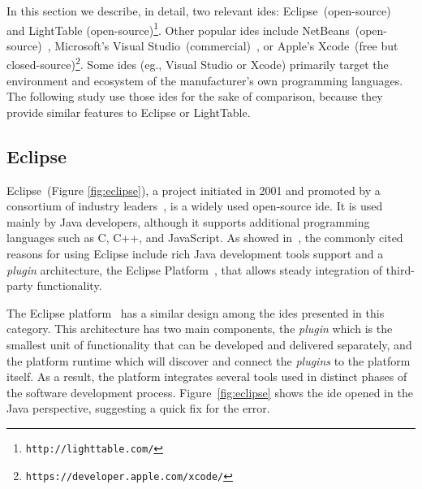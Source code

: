 In this section we describe, in detail, two relevant \glspl{ide}: Eclipse~(open-source)~\citep{carlson2005eclipse} and LightTable (open-source)\footnote{\label{fnote:lt}\texttt{http://lighttable.com/}}. Other popular \glspl{ide} include NetBeans~(open-source)~\citep{boudreau2002netbeans}, Microsoft's Visual Studio~(commercial)~\citep{guckenheimer2006software}, or Apple's Xcode~(free but closed-source)\footnote{\texttt{https://developer.apple.com/xcode/}}. Some \glspl{ide} (eg., Visual Studio or Xcode) primarily target the environment and ecosystem of the manufacturer's own programming languages.  The following study use those \glspl{ide} for the sake of comparison, because they provide similar features to Eclipse or LightTable.

\subsection{Eclipse} 
\label{subsec:eclipse}
Eclipse~(Figure \ref{fig:eclipse}), a project initiated in 2001 and promoted by a consortium of industry leaders~\citep{carlson2005eclipse}, is a widely used open-source \gls{ide}. It is used mainly by Java developers, although it supports additional programming languages such as C, C++, and JavaScript. As showed in~\citep{murphy2006java}, the commonly cited reasons for using Eclipse include rich Java development tools support and a \textit{plugin} architecture, the Eclipse Platform~\citep{DesRivieres2004}, that allows steady integration of third-party functionality.

The Eclipse platform~\citep{DesRivieres2004} has a similar design among the \glspl{ide} presented in this category. This architecture has two main components, the \textit{plugin} which is the smallest unit of functionality that can be developed and delivered separately, and the platform runtime which will discover and connect the \textit{plugins} to the platform itself. As a result, the platform integrates several tools used in distinct phases of the software development process. Figure~\ref{fig:eclipse} shows the \gls{ide} opened in the Java perspective, suggesting a quick fix for the error.

